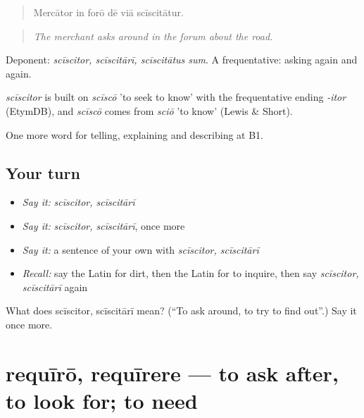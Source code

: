 \begin{quote}
Mercātor in forō dē viā scīscitātur.
\end{quote}

\begin{quote}
\emph{The merchant asks around in the forum about the road.}
\end{quote}

Deponent: \emph{scīscitor, scīscitārī, scīscitātus sum}. A frequentative: asking again and again.

\begin{cousinweb}
\emph{scīscitor} is built on \emph{scīscō} 'to seek to know' with the frequentative ending \emph{-itor} (EtymDB), and \emph{scīscō} comes from \emph{sciō} 'to know' (Lewis \& Short).
\end{cousinweb}

\begin{grammarlens}[title={What you've built}]
One more word for telling, explaining and describing at B1.
\end{grammarlens}

\subsection*{Your turn}
\begin{itemize}
\raggedright
  \item \emph{Say it:} \emph{scīscitor, scīscitārī}
  \item \emph{Say it:} \emph{scīscitor, scīscitārī}, once more
  \item \emph{Say it:} a sentence of your own with \emph{scīscitor, scīscitārī}
  \item \emph{Recall:} say the Latin for dirt, then the Latin for to inquire, then say \emph{scīscitor, scīscitārī} again
\end{itemize}

\begin{tcolorbox}[breakable,colback=teal!4,colframe=teal!35!black,title={Before you move on}]
What does scīscitor, scīscitārī mean? (\textquotedblleft{}To ask around, to try to find out\textquotedblright{}.) Say it once more.
\end{tcolorbox}
\section[requīrō, requīrere]{requīrō, requīrere — to ask after, to look for; to need}

\label{lesson:LA-C451-requiro}



